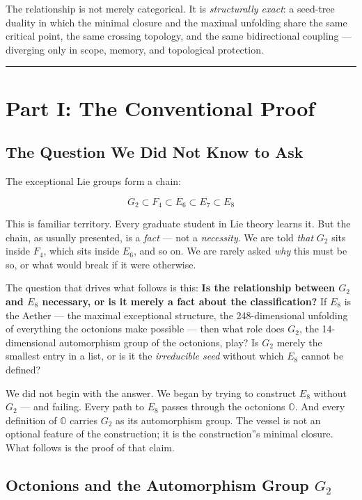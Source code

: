 \documentclass[12pt,a4paper]{article}
\begin{document}
The relationship is not merely categorical. It is \emph{structurally exact}: a seed-tree duality in which the minimal closure and the maximal unfolding share the same critical point, the same crossing topology, and the same bidirectional coupling --- diverging only in scope, memory, and topological protection.

\begin{center}
\rule{0.5\textwidth}{0.4pt}
\end{center}

\section{Part I: The Conventional Proof}

\subsection{The Question We Did Not Know to Ask}

The exceptional Lie groups form a chain:

\[G_2 \subset F_4 \subset E_6 \subset E_7 \subset E_8\]

This is familiar territory. Every graduate student in Lie theory learns it. But the chain, as usually presented, is a \emph{fact} --- not a \emph{necessity}. We are told \emph{that} $G_2$ sits inside $F_4$, which sits inside $E_6$, and so on. We are rarely asked \emph{why} this must be so, or what would break if it were otherwise.

The question that drives what follows is this: \textbf{Is the relationship between $G_2$ and $E_8$ necessary, or is it merely a fact about the classification?} If $E_8$ is the Aether --- the maximal exceptional structure, the 248-dimensional unfolding of everything the octonions make possible --- then what role does $G_2$, the 14-dimensional automorphism group of the octonions, play? Is $G_2$ merely the smallest entry in a list, or is it the \emph{irreducible seed} without which $E_8$ cannot be defined?

We did not begin with the answer. We began by trying to construct $E_8$ without $G_2$ --- and failing. Every path to $E_8$ passes through the octonions $\mathbb{O}$. And every definition of $\mathbb{O}$ carries $G_2$ as its automorphism group. The vessel is not an optional feature of the construction; it is the construction''s minimal closure. What follows is the proof of that claim.

\subsection{Octonions and the Automorphism Group $G_2$}
\end{document}
